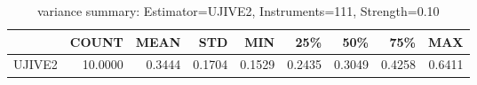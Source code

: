 \begin{table}[ht]
\centering
\caption{variance summary: Estimator=UJIVE2, Instruments=111, Strength=0.10}
\begin{tabular}{lrrrrrrrr}
\toprule
 & COUNT & MEAN & STD & MIN & 25\% & 50\% & 75\% & MAX \\
\midrule
UJIVE2 & 10.0000 & 0.3444 & 0.1704 & 0.1529 & 0.2435 & 0.3049 & 0.4258 & 0.6411 \\
\bottomrule
\end{tabular}
\end{table}
